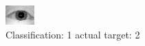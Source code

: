 \begin{figure}[h!]
\begin{center}
\includegraphics[width=0.60\columnwidth]{figures/ID1006_class_1_target_2.png}
\end{center}
\caption{ Classification: 1 actual target: 2}
\label{fig:ID1006_class_1_target_2}
\end{figure}
